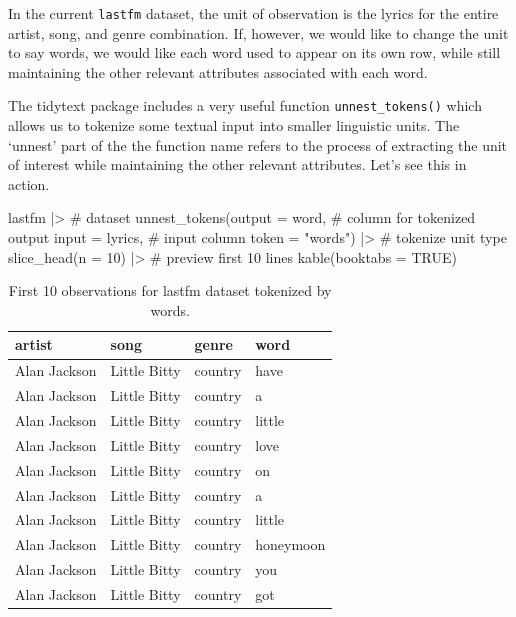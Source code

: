 \documentclass[
  letterpaper,
]{latex/krantz}
\newenvironment{Shaded}{\begin{snugshade}}{\end{snugshade}}
\newcommand{\AttributeTok}[1]{\textcolor[rgb]{0.40,0.45,0.13}{#1}}
\newcommand{\CommentTok}[1]{\textcolor[rgb]{0.37,0.37,0.37}{#1}}
\newcommand{\ConstantTok}[1]{\textcolor[rgb]{0.56,0.35,0.01}{#1}}
\newcommand{\DecValTok}[1]{\textcolor[rgb]{0.68,0.00,0.00}{#1}}
\newcommand{\FunctionTok}[1]{\textcolor[rgb]{0.28,0.35,0.67}{#1}}
\newcommand{\NormalTok}[1]{\textcolor[rgb]{0.00,0.23,0.31}{#1}}
\newcommand{\SpecialCharTok}[1]{\textcolor[rgb]{0.37,0.37,0.37}{#1}}
\newcommand{\StringTok}[1]{\textcolor[rgb]{0.13,0.47,0.30}{#1}}
\begin{document}
In the current \texttt{lastfm} dataset, the unit of observation is the
lyrics for the entire artist, song, and genre combination. If, however,
we would like to change the unit to say words, we would like each word
used to appear on its own row, while still maintaining the other
relevant attributes associated with each word.

The tidytext package includes a very useful function
\texttt{unnest\_tokens()} which allows us to tokenize some textual input
into smaller linguistic units. The `unnest' part of the the function
name refers to the process of extracting the unit of interest while
maintaining the other relevant attributes. Let's see this in action.

\begin{Shaded}
\begin{Highlighting}[]
\NormalTok{lastfm }\SpecialCharTok{|\textgreater{}} \CommentTok{\# dataset}
  \FunctionTok{unnest\_tokens}\NormalTok{(}\AttributeTok{output =}\NormalTok{ word, }\CommentTok{\# column for tokenized output}
                \AttributeTok{input =}\NormalTok{ lyrics, }\CommentTok{\# input column}
                \AttributeTok{token =} \StringTok{"words"}\NormalTok{) }\SpecialCharTok{|\textgreater{}} \CommentTok{\# tokenize unit type}
  \FunctionTok{slice\_head}\NormalTok{(}\AttributeTok{n =} \DecValTok{10}\NormalTok{) }\SpecialCharTok{|\textgreater{}}  \CommentTok{\# preview first 10 lines}
  \FunctionTok{kable}\NormalTok{(}\AttributeTok{booktabs =} \ConstantTok{TRUE}\NormalTok{)}
\end{Highlighting}
\end{Shaded}

\hypertarget{tbl-td-lastfm-tokenize-words}{}
\begin{table}
\caption{\label{tbl-td-lastfm-tokenize-words}First 10 observations for lastfm dataset tokenized by words. }\tabularnewline

\centering
\begin{tabular}{llll}
\toprule
artist & song & genre & word\\
\midrule
Alan Jackson & Little Bitty & country & have\\
Alan Jackson & Little Bitty & country & a\\
Alan Jackson & Little Bitty & country & little\\
Alan Jackson & Little Bitty & country & love\\
Alan Jackson & Little Bitty & country & on\\
\addlinespace
Alan Jackson & Little Bitty & country & a\\
Alan Jackson & Little Bitty & country & little\\
Alan Jackson & Little Bitty & country & honeymoon\\
Alan Jackson & Little Bitty & country & you\\
Alan Jackson & Little Bitty & country & got\\
\bottomrule
\end{tabular}
\end{table}
\end{document}
